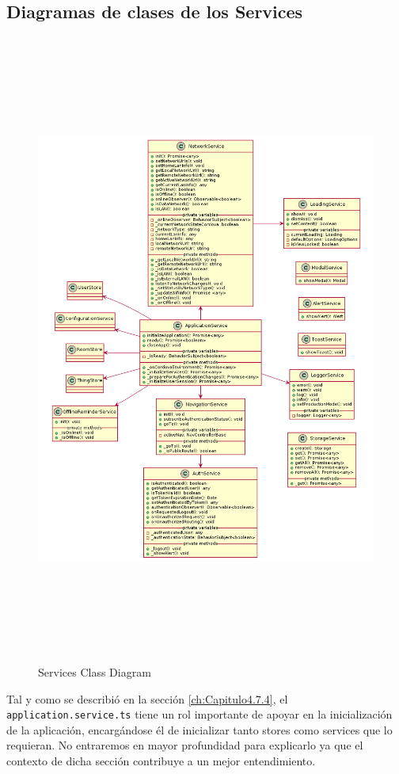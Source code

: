 \subsection{Diagramas de clases de los Services}
\label{ch:Capitulo4.7.6}

\begin{figure}[hbt!]
\centering
\includegraphics[height=8.2in]{figures/diagrams/front/architecture/services.png}
\caption[services]{Services Class Diagram\footnotemark}
\end{figure}

Tal y como se describió en la sección \ref{ch:Capitulo4.7.4}, el \verb|application.service.ts| tiene un rol importante de apoyar en la inicialización de la aplicación, encargándose él de inicializar tanto stores como services que lo requieran. No entraremos en mayor profundidad para explicarlo ya que el contexto de dicha sección contribuye a un mejor entendimiento.


